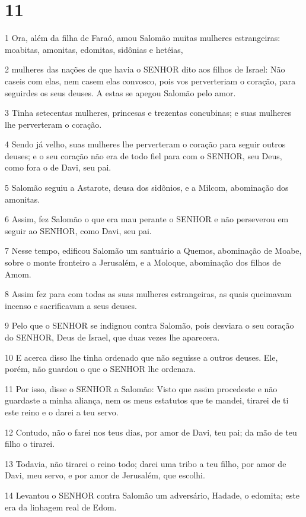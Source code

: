 \chapter{11}

\par 1 Ora, além da filha de Faraó, amou Salomão muitas mulheres estrangeiras: moabitas, amonitas, edomitas, sidônias e hetéias,
\par 2 mulheres das nações de que havia o SENHOR dito aos filhos de Israel: Não caseis com elas, nem casem elas convosco, pois vos perverteriam o coração, para seguirdes os seus deuses. A estas se apegou Salomão pelo amor.
\par 3 Tinha setecentas mulheres, princesas e trezentas concubinas; e suas mulheres lhe perverteram o coração.
\par 4 Sendo já velho, suas mulheres lhe perverteram o coração para seguir outros deuses; e o seu coração não era de todo fiel para com o SENHOR, seu Deus, como fora o de Davi, seu pai.
\par 5 Salomão seguiu a Astarote, deusa dos sidônios, e a Milcom, abominação dos amonitas.
\par 6 Assim, fez Salomão o que era mau perante o SENHOR e não perseverou em seguir ao SENHOR, como Davi, seu pai.
\par 7 Nesse tempo, edificou Salomão um santuário a Quemos, abominação de Moabe, sobre o monte fronteiro a Jerusalém, e a Moloque, abominação dos filhos de Amom.
\par 8 Assim fez para com todas as suas mulheres estrangeiras, as quais queimavam incenso e sacrificavam a seus deuses.
\par 9 Pelo que o SENHOR se indignou contra Salomão, pois desviara o seu coração do SENHOR, Deus de Israel, que duas vezes lhe aparecera.
\par 10 E acerca disso lhe tinha ordenado que não seguisse a outros deuses. Ele, porém, não guardou o que o SENHOR lhe ordenara.
\par 11 Por isso, disse o SENHOR a Salomão: Visto que assim procedeste e não guardaste a minha aliança, nem os meus estatutos que te mandei, tirarei de ti este reino e o darei a teu servo.
\par 12 Contudo, não o farei nos teus dias, por amor de Davi, teu pai; da mão de teu filho o tirarei.
\par 13 Todavia, não tirarei o reino todo; darei uma tribo a teu filho, por amor de Davi, meu servo, e por amor de Jerusalém, que escolhi.
\par 14 Levantou o SENHOR contra Salomão um adversário, Hadade, o edomita; este era da linhagem real de Edom.
